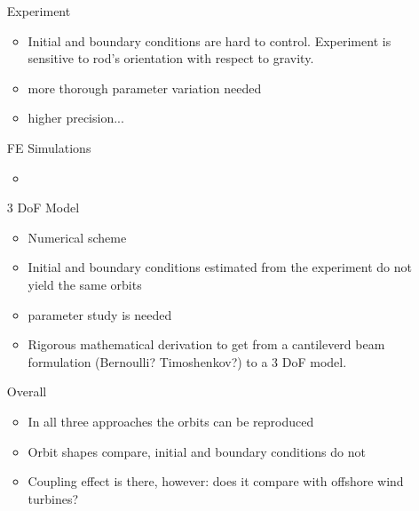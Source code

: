 \documentclass{article}
\begin{document}
\begin{itemize}
    \item [Experiment]
    \begin{itemize}
        \item Initial and boundary conditions are hard to control. Experiment is sensitive to rod's orientation with respect to gravity. 
        \item more thorough parameter variation needed
        \item higher precision... 
    \end{itemize}
    \item [FE Simulations]
    \begin{itemize}
        \item 
    \end{itemize}
    \item [3 DoF Model]
    \begin{itemize}
        \item Numerical scheme
        \item Initial and boundary conditions estimated from the experiment do not yield the same orbits
        \item parameter study is needed
        \item Rigorous mathematical derivation to get from a cantileverd beam formulation (Bernoulli? Timoshenkov?) to a 3 DoF model.
    \end{itemize}
    \item[Overall]
    \begin{itemize}
        \item In all three approaches the orbits can be reproduced
        \item Orbit shapes compare, initial and boundary conditions do not
        \item Coupling effect is there, however: does it compare with offshore wind turbines?
    \end{itemize}
\end{itemize}

\clearpage


\end{document}
